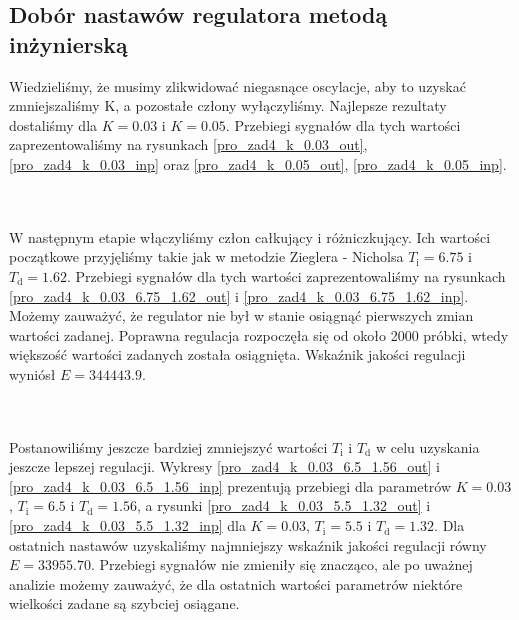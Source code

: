 \subsection{Dobór nastawów regulatora metodą inżynierską}
Wiedzieliśmy, że musimy zlikwidować niegasnące oscylacje, aby to uzyskać zmniejszaliśmy K, a pozostałe człony wyłączyliśmy. Najlepsze rezultaty dostaliśmy dla $ K = \num{0.03} $ i $ K = \num{0.05} $. Przebiegi sygnałów dla tych wartości zaprezentowaliśmy na rysunkach \ref{pro_zad4_k_0.03_out}, \ref{pro_zad4_k_0.03_inp} oraz \ref{pro_zad4_k_0.05_out}, \ref{pro_zad4_k_0.05_inp}.

~\\\\ W następnym etapie włączyliśmy człon całkujący i różniczkujący. Ich wartości początkowe przyjęliśmy takie jak w metodzie Zieglera - Nicholsa $T_{\mathrm{i}} = \num{6.75}$ i $T_{\mathrm{d}} = \num{1.62}$. Przebiegi sygnałów dla tych wartości zaprezentowaliśmy na rysunkach \ref{pro_zad4_k_0.03_6.75_1.62_out} i \ref{pro_zad4_k_0.03_6.75_1.62_inp}. Możemy zauważyć, że regulator nie był w stanie osiągnąć pierwszych zmian wartości zadanej. Poprawna regulacja rozpoczęła się od około 2000 próbki, wtedy większość wartości zadanych została osiągnięta. Wskaźnik jakości regulacji wyniósł $E = 344443.9$. 

~\\\\ Postanowiliśmy jeszcze bardziej zmniejszyć wartości $T_{\mathrm{i}}$ i $T_{\mathrm{d}}$ w celu uzyskania jeszcze lepszej regulacji. Wykresy \ref{pro_zad4_k_0.03_6.5_1.56_out} i \ref{pro_zad4_k_0.03_6.5_1.56_inp} prezentują przebiegi dla parametrów $K = \num{0,03}$, $T_{\mathrm{i}} = \num{6.5}$ i $T_{\mathrm{d}} = \num{1.56}$, a rysunki \ref{pro_zad4_k_0.03_5.5_1.32_out} i \ref{pro_zad4_k_0.03_5.5_1.32_inp} dla $K = \num{0,03}$, $T_{\mathrm{i}} = \num{5.5}$ i $T_{\mathrm{d}} = \num{1.32}$. Dla ostatnich nastawów uzyskaliśmy najmniejszy wskaźnik jakości regulacji równy $E = \num{33955,70}$. Przebiegi sygnałów nie zmieniły się znacząco, ale po uważnej analizie możemy zauważyć, że dla ostatnich wartości parametrów niektóre wielkości zadane są szybciej osiągane. 


